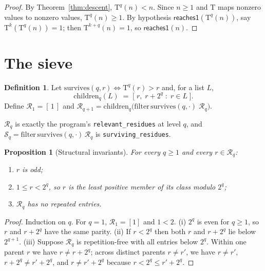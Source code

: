 \documentclass[11pt,a4paper]{article}
\theoremstyle{plain}
\newtheorem{proposition}[theorem]{Proposition}
\theoremstyle{definition}
\newtheorem{definition}[theorem]{Definition}
\newcommand{\Tmap}{\mathrm{T}}
\newcommand{\reaches}{\mathsf{reaches1}}
\newcommand{\Rlev}{\mathcal{R}}
\newcommand{\Slev}{\mathcal{S}}
\begin{document}
\begin{proof}
By Theorem~\ref{thm:descent}, $\Tmap^{q}(n) < n$. Since $n \geq 1$ and
$\Tmap$ maps nonzero values to nonzero values, $\Tmap^{q}(n) \geq 1$. By
hypothesis $\reaches(\Tmap^{q}(n))$, say $\Tmap^{k}(\Tmap^{q}(n)) = 1$; then
$\Tmap^{k+q}(n) = 1$, so $\reaches(n)$.
\end{proof}

\section{The sieve}
\label{sec:sieve}

\begin{definition}\label{def:sieve}
Let $\mathrm{survives}(q, r) \iff \Tmap^{q}(r) > r$ and, for a list $L$,
\[
  \mathrm{children}_{q}(L) \;=\;
  \bigl[\; r,\; r + 2^{q} \;:\; r \in L \;\bigr].
\]
Define $\Rlev_{1} = [\,1\,]$ and
$\Rlev_{q+1} = \mathrm{children}_{q}\bigl(\mathrm{filter}\,
\mathrm{survives}(q,\cdot)\;\Rlev_{q}\bigr)$.
\end{definition}

$\Rlev_{q}$ is exactly the program's \texttt{relevant\_residues} at level $q$,
and $\Slev_{q} = \mathrm{filter}\,\mathrm{survives}(q,\cdot)\,\Rlev_{q}$ is
\texttt{surviving\_residues}.

\begin{proposition}[Structural invariants]\label{prop:struct}
For every $q \geq 1$ and every $r \in \Rlev_{q}$:
\begin{enumerate}\itemsep1pt
\item[(i)] $r$ is odd;
\item[(ii)] $1 \leq r < 2^{q}$, so $r$ is the least positive member of its
      class modulo $2^{q}$;
\item[(iii)] $\Rlev_{q}$ has no repeated entries.
\end{enumerate}
\end{proposition}

\begin{proof}
Induction on $q$. For $q=1$, $\Rlev_{1} = [1]$ and $1 < 2$.
(i) $2^{q}$ is even for $q \geq 1$, so $r$ and $r + 2^{q}$ have the same
parity. (ii) If $r < 2^{q}$ then both $r$ and $r + 2^{q}$ lie below
$2^{q+1}$. (iii) Suppose $\Rlev_{q}$ is repetition-free with all entries below
$2^{q}$. Within one parent $r$ we have $r \neq r + 2^{q}$; across distinct
parents $r \neq r'$, we have $r \neq r'$, $r + 2^{q} \neq r' + 2^{q}$, and
$r \neq r' + 2^{q}$ because $r < 2^{q} \leq r' + 2^{q}$.
\end{proof}
\end{document}
